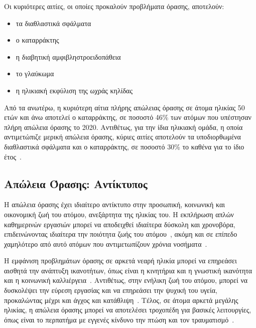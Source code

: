 Οι κυριότερες αιτίες, οι οποίες προκαλούν προβλήματα όρασης, αποτελούν:
\begin{itemize}
    \item τα διαθλαστικά σφάλματα
    \item ο καταρράκτης
    \item η διαβητική αμφιβληστροειδοπάθεια
    \item το γλαύκωμα
    \item η ηλικιακή εκφύλιση της ωχράς κηλίδας
\end{itemize}
Από τα ανωτέρω, η κυριότερη αίτια πλήρης απώλειας όρασης σε άτομα ηλικίας 50 ετών και άνω αποτελεί ο καταρράκτης, σε ποσοστό 46\% των ατόμων που υπέστησαν πλήρη απώλεια όρασης το 2020. Αντιθέτως, για την ίδια ηλικιακή ομάδα, η οποία αντιμετώπιζε μερική απώλεια όρασης, κύριες αιτίες αποτελούν τα υποδιορθωμένα διαθλαστικά σφάλματα και ο καταρράκτης, σε ποσοστό 30\% το καθένα για το ίδιο έτος~\cite{adelson_2021_causes}.

\subsection{Απώλεια Όρασης: Αντίκτυπος}\label{subsec:visionImpact}
Η απώλεια όρασης έχει ιδιαίτερο αντίκτυπο στην προσωπική, κοινωνική και οικονομική ζωή του ατόμου, ανεξάρτητα της ηλικίας του. Η εκπλήρωση απλών καθημερινών εργασιών μπορεί να αποδειχθεί ιδιαίτερα δύσκολη και χρονοβόρα, επιδεινώνοντας ιδιαίτερα την ποιότητα ζωής του ατόμου~\cite{west_2002_how}\cite{khorraminejad_2016_the}, ακόμη και σε επίπεδο χαμηλότερο από αυτό ατόμων που αντιμετωπίζουν χρόνια νοσήματα~\cite{langelaan_2007_impact}.



Η εμφάνιση προβλημάτων όρασης σε αρκετά νεαρή ηλικία μπορεί να επηρεάσει αισθητά την ανάπτυξη ικανοτήτων, όπως είναι η κινητήρια και η γνωστική ικανότητα και η κοινωνική καλλιέργεια~\cite{worldhealthorganization_2023_blindness}. Αντιθέτως, στην ενήλικη ζωή του ατόμου, μπορεί να δυσκολέψει την εύρεση εργασίας και να επηρεάσει την ψυχική του υγεία, προκαλώντας μέχρι και άγχος και κατάθλιψη~\cite{khorraminejad_2016_the}. Τέλος, σε άτομα αρκετά μεγάλης ηλικίας, η απώλεια όρασης μπορεί να αποτελέσει τροχοπέδη για βασικές λειτουργίες, όπως είναι το περπατήμα με εγγενές κίνδυνο την πτώση και τον τραυματισμό~\cite{worldhealthorganization_2023_blindness}.

